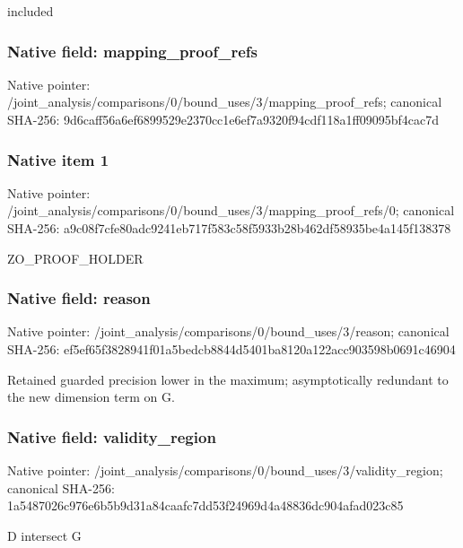 \documentclass[10pt,a4paper]{article}
\begin{document}
\begingroup\raggedright\sloppy included\par\endgroup

\subsubsection{Native field: mapping\_\allowbreak{}proof\_\allowbreak{}refs}
Native pointer: /joint\_\allowbreak{}analysis/comparisons/0/bound\_\allowbreak{}uses/3/mapping\_\allowbreak{}proof\_\allowbreak{}refs; canonical SHA-256: 9d6caff56a6ef6899529e2370cc1e6ef7a9320f94cdf118a1ff09095bf4cac7d

\subsubsection{Native item 1}
Native pointer: /joint\_\allowbreak{}analysis/comparisons/0/bound\_\allowbreak{}uses/3/mapping\_\allowbreak{}proof\_\allowbreak{}refs/0; canonical SHA-256: a9c08f7cfe80adc9241eb717f583c58f5933b28b462df58935be4a145f138378

\begingroup\raggedright\sloppy ZO\_\allowbreak{}PROOF\_\allowbreak{}HOLDER\par\endgroup

\subsubsection{Native field: reason}
Native pointer: /joint\_\allowbreak{}analysis/comparisons/0/bound\_\allowbreak{}uses/3/reason; canonical SHA-256: ef5ef65f3828941f01a5bedcb8844d5401ba8120a122acc903598b0691c46904

\begingroup\raggedright\sloppy Retained guarded precision lower in the maximum;\allowbreak{} asymptotically redundant to the new dimension term on G.\par\endgroup

\subsubsection{Native field: validity\_\allowbreak{}region}
Native pointer: /joint\_\allowbreak{}analysis/comparisons/0/bound\_\allowbreak{}uses/3/validity\_\allowbreak{}region; canonical SHA-256: 1a5487026c976e6b5b9d31a84caafc7dd53f24969d4a48836dc904afad023c85

\begingroup\raggedright\sloppy D intersect G\par\endgroup
\end{document}
